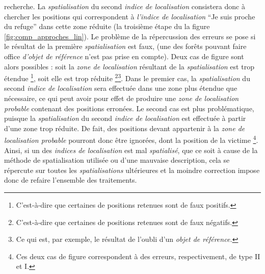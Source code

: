 recherche. La \emph{spatialisation} du second \emph{indice de
  localisation} consistera donc à chercher les positions qui
correspondent à \emph{l'indice de localisation} \enquote{Je suis
  proche du refuge} dans cette zone réduite (\ie la troisième étape du
la figure \ref{fig:comp_approches_lin}). Le problème de la
répercussion des erreurs se pose si le résultat de la première
\emph{spatialisation} est faux, (\eg une des forêts pouvant faire
office \emph{d'objet de référence} n'est pas prise en compte). Deux
cas de figure sont alors possibles : soit la \emph{zone de
  localisation} résultant de la \emph{spatialisation} est trop étendue
\footnote{C'est-à-dire que certaines de positions retenues sont de
  faux positifs.}, soit elle est trop réduite \footnote{C'est-à-dire
  que certaines de positions retenues sont de faux
  négatifs.}\multiplefootnoteseparator \footnote{Ce qui est, par
  exemple, le résultat de l'oubli d'un \emph{objet de référence.}}.
Dans le premier cas, la \emph{spatialisation} du second \emph{indice
  de localisation} sera effectuée dans une zone plus étendue que
nécessaire, ce qui peut avoir pour effet de produire une \emph{zone de
  localisation probable} contenant des positions erronées. Le second
cas est plus problématique, puisque la \emph{spatialisation} du second
\emph{indice de localisation} est effectuée à partir d'une zone trop
réduite. De fait, des positions devant appartenir à la \emph{zone de
  localisation probable} pourront donc être ignorées, dont la position
de la victime \footnote{Ces deux cas de figure correspondent à des
  erreurs, respectivement, de type II et I.}. Ainsi, si un des
\emph{indices de localisation} est mal \emph{spatialisé}, que ce soit
à cause de la méthode de spatialisation utilisée ou d'une mauvaise
description, cela se répercute sur toutes les \emph{spatialisations}
ultérieures et la moindre correction impose donc de refaire l'ensemble
des traitements.

